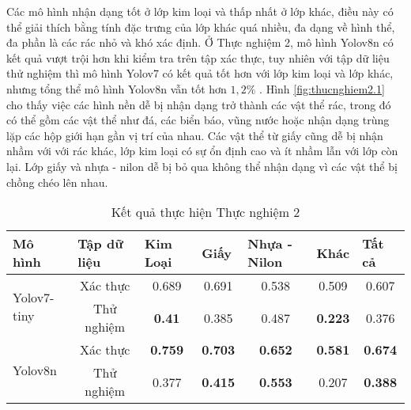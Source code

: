 \documentclass[../the.tex]{subfiles}
\begin{document}
\bigskip

{\fontsize{13}{12} \selectfont
    Các mô hình nhận dạng tốt ở lớp kim loại và thấp nhất ở lớp khác,
    điều này có thể giải thích bằng tính đặc trưng của lớp khác quá nhiều, đa dạng về hình thể, đa phần là các rác nhỏ và khó xác định.
    Ở Thực nghiệm 2, mô hình Yolov8n có kết quả vượt trội hơn khi kiểm tra trên tập xác thực, tuy nhiên với tập dữ liệu thử nghiệm thì mô hình Yolov7 có kết quả tốt hơn với lớp kim loại và lớp khác, nhưng tổng thể mô hình Yolov8n vẫn tốt hơn $1,2\%$ .
    Hình \ref{fig:thucnghiem2.1} cho thấy việc các hình nền dễ bị nhận dạng trở thành các vật thể rác, trong đó có thể gồm các vật thể như đá, các biển báo, vũng nước hoặc nhận dạng trùng lặp các hộp giới hạn gần vị trí của nhau.
    Các vật thể từ giấy cũng dễ bị nhận nhầm với với rác khác, lớp kim loại có sự ổn định cao và ít nhầm lẫn với lớp còn lại. Lớp giấy và nhựa - nilon dễ bị bỏ qua không thể nhận dạng vì các vật thể bị chồng chéo lên nhau.
}
\begin{table}[h!]
    \centering
    \caption{Kết quả thực hiện Thực nghiệm 2}
    \begin{tabular}{|l|c|c|c|c|c|c|}
        \hline
        \textbf{Mô hình}             & \multicolumn{1}{l|}{\textbf{Tập dữ liệu}} & \multicolumn{1}{l|}{\textbf{Kim Loại}} & \multicolumn{1}{l|}{\textbf{Giấy}} & \multicolumn{1}{l|}{\textbf{Nhựa - Nilon}} & \multicolumn{1}{l|}{\textbf{Khác}} & \multicolumn{1}{l|}{\textbf{Tất cả}} \\ \hline
        \multirow{2}{*}{Yolov7-tiny} & Xác thực                                  & 0.689                                  & 0.691                              & 0.538                                      & 0.509                              & 0.607                                \\ \cline{2-7}
                                     & Thử nghiệm                                & \textbf{0.41}                          & 0.385                              & 0.487                                      & \textbf{0.223}                     & 0.376                                \\ \hline
        \multirow{2}{*}{Yolov8n}     & Xác thực                                  & \textbf{0.759}                         & \textbf{0.703}                     & \textbf{0.652}                             & \textbf{0.581}                     & \textbf{0.674}                       \\ \cline{2-7}
                                     & Thử nghiệm                                & 0.377                                  & \textbf{0.415}                     & \textbf{0.553}                             & 0.207                              & \textbf{0.388}                       \\ \hline
    \end{tabular}
    \label{tab:thucnghiem2.1}
\end{table}
\end{document}
